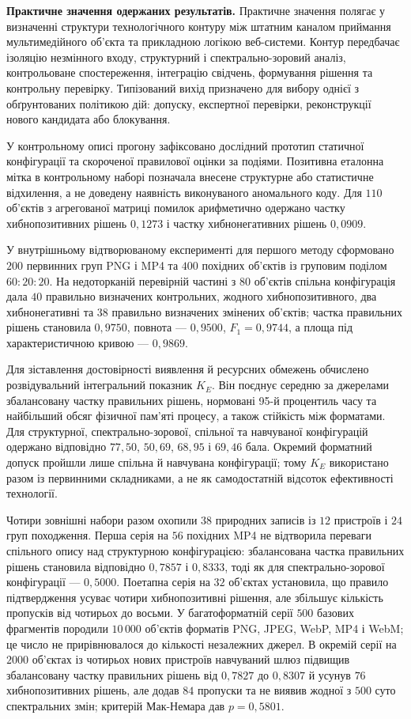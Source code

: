 \textbf{Практичне значення одержаних результатів.}
Практичне значення полягає у визначенні структури технологічного контуру між штатним каналом приймання мультимедійного об’єкта та прикладною логікою веб-системи. Контур передбачає ізоляцію незмінного входу, структурний і спектрально-зоровий аналіз, контрольоване спостереження, інтеграцію свідчень, формування рішення та контрольну перевірку. Типізований вихід призначено для вибору однієї з обґрунтованих політикою дій: допуску, експертної перевірки, реконструкції нового кандидата або блокування.

У контрольному описі прогону зафіксовано дослідний прототип статичної конфігурації та скороченої правилової оцінки за подіями. Позитивна еталонна мітка в контрольному наборі позначала внесене структурне або статистичне відхилення, а не доведену наявність виконуваного аномального коду. Для $110$ об’єктів з агрегованої матриці помилок арифметично одержано частку хибнопозитивних рішень $0{,}1273$ і частку хибнонегативних рішень $0{,}0909$.

У внутрішньому відтворюваному експерименті для першого методу сформовано $200$ первинних груп PNG і MP4 та $400$ похідних об’єктів із груповим поділом $60:20:20$. На недоторканій перевірній частині з $80$ об’єктів спільна конфігурація дала $40$ правильно визначених контрольних, жодного хибнопозитивного, два хибнонегативні та $38$ правильно визначених змінених об’єктів; частка правильних рішень становила $0{,}9750$, повнота --- $0{,}9500$, $F_1=0{,}9744$, а площа під характеристичною кривою --- $0{,}9869$.

Для зіставлення достовірності виявлення й ресурсних обмежень обчислено розвідувальний інтегральний показник $K_E$. Він поєднує середню за джерелами збалансовану частку правильних рішень, нормовані 95-й процентиль часу та найбільший обсяг фізичної пам’яті процесу, а також стійкість між форматами. Для структурної, спектрально-зорової, спільної та навчуваної конфігурацій одержано відповідно $77{,}50$, $50{,}69$, $68{,}95$ і $69{,}46$ бала. Окремий форматний допуск пройшли лише спільна й навчувана конфігурації; тому $K_E$ використано разом із первинними складниками, а не як самодостатній відсоток ефективності технології.

Чотири зовнішні набори разом охопили $38$ природних записів із $12$ пристроїв і $24$ груп походження. Перша серія на $56$ похідних MP4 не відтворила переваги спільного опису над структурною конфігурацією: збалансована частка правильних рішень становила відповідно $0{,}7857$ і $0{,}8333$, тоді як для спектрально-зорової конфігурації --- $0{,}5000$. Поетапна серія на $32$ об’єктах установила, що правило підтвердження усуває чотири хибнопозитивні рішення, але збільшує кількість пропусків від чотирьох до восьми. У багатоформатній серії $500$ базових фрагментів породили $10\,000$ об’єктів форматів PNG, JPEG, WebP, MP4 і WebM; це число не прирівнювалося до кількості незалежних джерел. В окремій серії на $2000$ об’єктах із чотирьох нових пристроїв навчуваний шлюз підвищив збалансовану частку правильних рішень від $0{,}7827$ до $0{,}8307$ й усунув $76$ хибнопозитивних рішень, але додав $84$ пропуски та не виявив жодної з $500$ суто спектральних змін; критерій Мак-Немара дав $p=0{,}5801$.

